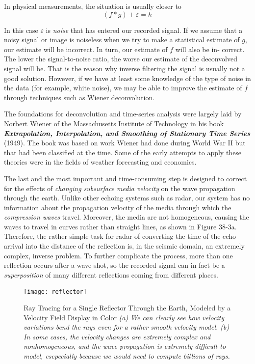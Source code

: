 \documentclass[twocolumn]{article}
\begin{document}
In physical measurements, the situation is usually closer to
$$(f * g) + \varepsilon = h $$

In this case $\varepsilon$ is \textit{noise} that has entered our recorded signal. If we assume that a noisy signal or image is noiseless when we try to make a statistical estimate of $g$, our estimate will be incorrect. 
In turn, our estimate of $f$ will also be in‐ correct. 
The lower the signal-to-noise ratio, the worse our estimate of the deconvolved signal will be. 
That is the reason why inverse filtering the signal is usually not a good solution. 
However, if we have at least some knowledge of the type of noise in the data (for example, white noise), we may be able to improve the estimate of $f$ through techniques such as Wiener deconvolution.

The foundations for deconvolution and time-series analysis were largely laid by Norbert Wiener of the Massachusetts Institute of Technology in his book \textbf{\textit{Extrapolation, Interpolation, and Smoothing of Stationary Time Series}} (1949).
The book was based on work Wiener had done during World War II but that had been classified at the time. 
Some of the early attempts to apply these theories were in the fields of weather forecasting and economics.



The last and the most important and time-consuming step is designed to correct for the effects of \textit{changing subsurface media velocity }on the wave propagation through the earth. Unlike other echoing systems such as radar, our system has no information about the propagation velocity of the media through which the \emph{compression waves} travel. Moreover, the media are not homogeneous, causing the waves to travel in curves rather than straight lines, as shown in Figure 38-3a. Therefore, the rather simple task for radar of converting the time of the echo arrival into the distance of the reflection is, in the seismic domain, an extremely complex, inverse problem. To further complicate the process, more than one reflection occurs after a wave shot, so the recorded signal can in fact be a \emph{superposition} of many different reflections coming from different places.

\begin{figure}[htb]
        \centering
        \texttt{[image: reflector]}
        \caption{Ray Tracing for a Single Reflector Through the Earth, Modeled by a Velocity Field Display in Color \small{\emph{(a) We can clearly see how velocity variations bend the rays even for a rather smooth velocity model. (b) In some cases, the velocity changes are extremely complex and nonhomogeneous, and the wave propagation is extremely difficult to model, escpecially because we would need to compute billions of rays.}}}
        \label{reflector}
\end{figure}
\end{document}
